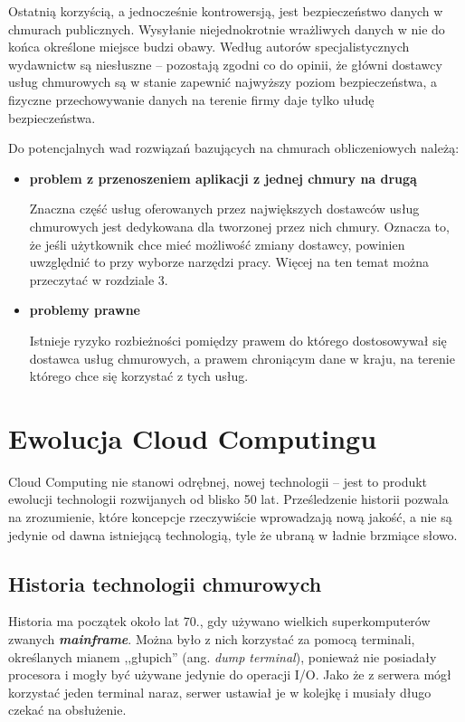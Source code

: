 \documentclass[12pt,a4paper,twoside,titlepage,openright]{book}
\begin{document}
Ostatnią korzyścią, a jednocześnie kontrowersją, jest bezpieczeństwo danych w chmurach publicznych. Wysyłanie niejednokrotnie wrażliwych danych w nie do końca określone miejsce budzi obawy. Według autorów specjalistycznych wydawnictw\cite{ccCambridge,ccBiznes} są niesłuszne -- pozostają zgodni co do opinii, że główni dostawcy usług chmurowych są w stanie zapewnić najwyższy poziom bezpieczeństwa, a fizyczne przechowywanie danych na terenie firmy daje tylko ułudę bezpieczeństwa.

Do potencjalnych wad rozwiązań bazujących na chmurach obliczeniowych należą:

\begin{itemize}

\item \textbf{problem z przenoszeniem aplikacji z jednej chmury na drugą}

Znaczna część usług oferowanych przez największych dostawców usług chmurowych jest dedykowana dla tworzonej przez nich chmury. Oznacza to, że jeśli użytkownik chce mieć możliwość zmiany dostawcy, powinien uwzględnić to przy wyborze narzędzi pracy. Więcej na ten temat można przeczytać w rozdziale 3.

\item \textbf{problemy prawne}

Istnieje ryzyko rozbieżności pomiędzy prawem do którego dostosowywał się dostawca usług chmurowych, a prawem chroniącym dane w kraju, na terenie którego chce się korzystać z tych usług. 

\end{itemize}


\section{Ewolucja Cloud Computingu}

Cloud Computing nie stanowi odrębnej, nowej technologii -- jest to produkt ewolucji technologii rozwijanych od blisko 50 lat. Prześledzenie historii pozwala na zrozumienie, które koncepcje rzeczywiście wprowadzają nową jakość, a nie są jedynie od dawna istniejącą technologią, tyle że  ubraną w ładnie brzmiące słowo.

\subsection{Historia technologii chmurowych}

Historia ma początek około lat 70., gdy używano wielkich superkomputerów zwanych \textbf{\textit{mainframe}}. Można było z nich korzystać za pomocą terminali, określanych mianem ,,głupich'' (ang. \textit{dump terminal}), ponieważ nie posiadały procesora i mogły być używane jedynie do operacji I/O. Jako że z serwera mógł korzystać jeden terminal naraz, serwer ustawiał je w kolejkę i musiały długo czekać na obsłużenie.
\end{document}
